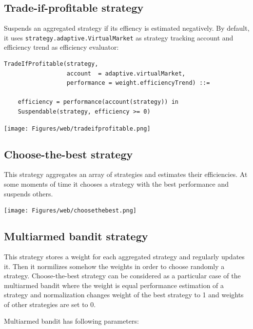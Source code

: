 \documentclass[a4paper,11pt]{article}
\begin{document}
\subsection{Trade-if-profitable
strategy}\label{trade-if-profitable-strategy}

Suspends an aggregated strategy if its effiency is estimated negatively.
By default, it uses \texttt{strategy.adaptive.VirtualMarket} as strategy
tracking account and efficiency trend as efficiency evaluator:

\begin{verbatim}
TradeIfProfitable(strategy,
                  account  = adaptive.virtualMarket,
                  performance = weight.efficiencyTrend) ::=

    efficiency = performance(account(strategy)) in
    Suspendable(strategy, efficiency >= 0)
\end{verbatim}

\centerline{\texttt{[image: Figures/web/tradeifprofitable.png]}}

\subsection{Choose-the-best strategy}\label{choose-the-best-strategy}

This strategy aggregates an array of strategies and estimates their
efficiencies. At some moments of time it chooses a strategy with the
best performance and suspends others.

\centerline{\texttt{[image: Figures/web/choosethebest.png]}}

\subsection{Multiarmed bandit strategy}\label{multiarmed-bandit-strategy}

This strategy stores a weight for each aggregated strategy and regularly
updates it. Then it normilizes somehow the weights in order to choose
randomly a strategy. Choose-the-best strategy can be considered as a
particular case of the multiarmed bandit where the weight is equal
performance estimation of a strategy and normalization changes weight of
the best strategy to 1 and weights of other strategies are set to 0.

Multiarmed bandit has following parameters:
\end{document}
